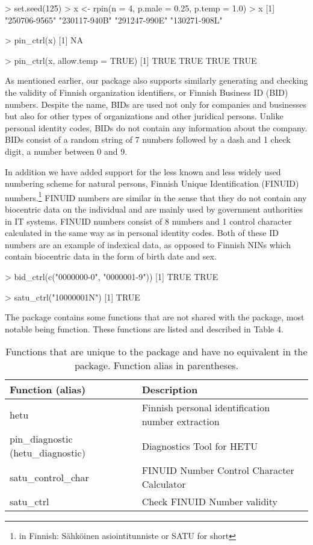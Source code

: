 \begin{example}
  > set.seed(125)
  > x <- rpin(n = 4, p.male = 0.25, p.temp = 1.0)
  > x
  [1] "250706-9565" "230117-940B" "291247-990E" "130271-908L"
  
  > pin_ctrl(x)
  [1] NA
  
  > pin_ctrl(x, allow.temp = TRUE)
  [1] TRUE TRUE TRUE TRUE
\end{example}

As mentioned earlier, our package also supports similarly generating and checking the validity of Finnish organization identifiers, or Finnish Business ID (BID) numbers. Despite the name, BIDs are used not only for companies and businesses but also for other types of organizations and other juridical persons. Unlike personal identity codes, BIDs do not contain any information about the company. BIDs consist of a random string of 7 numbers followed by a dash and 1 check digit, a number between 0 and 9. 

In addition we have added support for the less known and less widely used numbering scheme for natural persons, Finnish Unique Identification (FINUID) numbers.\footnote{in Finnish: Sähköinen asiointitunniste or SATU for short} FINUID numbers are similar in the sense that they do not contain any biocentric data on the individual and are mainly used by government authorities in IT systems. FINUID numbers consist of 8 numbers and 1 control character calculated in the same way as in personal identity codes. Both of these ID numbers are an example of indexical data, as opposed to Finnish NINs which contain biocentric data in the form of birth date and sex.

\begin{example}
  > bid_ctrl(c("0000000-0", "0000001-9"))
  [1] TRUE TRUE

  > satu_ctrl("10000001N")
  [1] TRUE
\end{example}

The  package contains some functions that are not shared with the  package, most notable being  function. These functions are listed and described in Table 4.

\begin{table}[ht]
\centering
\begin{tabular}{ll}
\toprule
    Function (alias) & Description \\
  \hline
  hetu & Finnish personal identification number extraction \\
  pin\_diagnostic (hetu\_diagnostic) & Diagnostics Tool for HETU \\
  satu\_control\_char & FINUID Number Control Character Calculator \\
  satu\_ctrl & Check FINUID Number validity \\
  
\bottomrule
\end{tabular}
\caption{Functions that are unique to the  package and have no equivalent in the  package. Function alias in parentheses.}
\label{tab:hetu_unique_functions}
\end{table}

